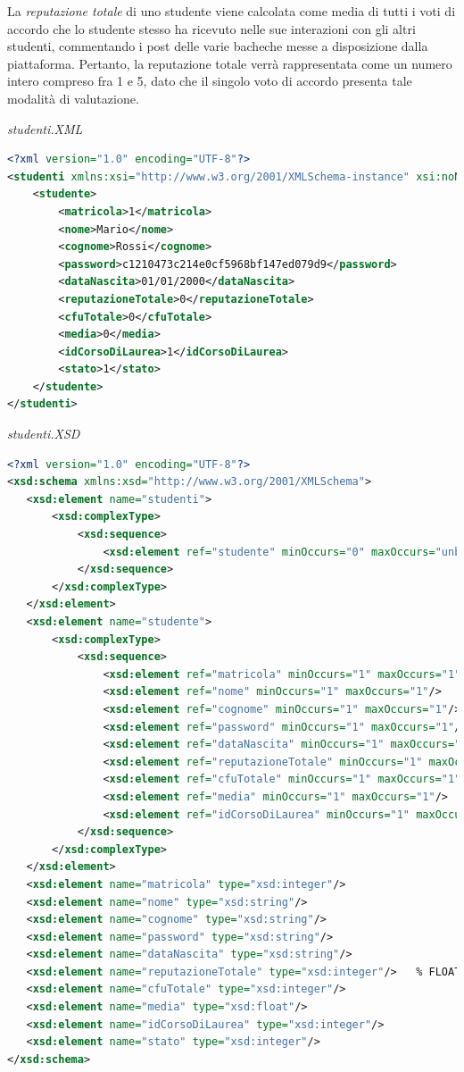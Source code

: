 \documentclass [a4paper,11pt]{book}
\begin{document}
La \emph{reputazione totale} di uno studente viene calcolata come media di tutti i voti di accordo che lo studente stesso ha ricevuto nelle sue interazioni con gli altri studenti, commentando i post delle varie bacheche messe a disposizione dalla piattaforma. Pertanto, la reputazione totale verrà rappresentata come un numero intero compreso fra 1 e 5, dato che il singolo voto di accordo presenta tale modalità di valutazione.

\medskip

\emph{studenti.XML}

\label{sec:studenti}

\begin{lstlisting}[language=XML]
<?xml version="1.0" encoding="UTF-8"?>
<studenti xmlns:xsi="http://www.w3.org/2001/XMLSchema-instance" xsi:noNamespaceSchemaLocation="studenti.xsd">
    <studente>
        <matricola>1</matricola>
        <nome>Mario</nome>
        <cognome>Rossi</cognome>
        <password>c1210473c214e0cf5968bf147ed079d9</password>
        <dataNascita>01/01/2000</dataNascita>
        <reputazioneTotale>0</reputazioneTotale>
        <cfuTotale>0</cfuTotale>
        <media>0</media>
        <idCorsoDiLaurea>1</idCorsoDiLaurea>
        <stato>1</stato>
    </studente>
</studenti>
\end{lstlisting}

\emph{studenti.XSD}

\begin{lstlisting}[language=XML]
<?xml version="1.0" encoding="UTF-8"?>
<xsd:schema xmlns:xsd="http://www.w3.org/2001/XMLSchema">
   <xsd:element name="studenti">
       <xsd:complexType>
           <xsd:sequence>
               <xsd:element ref="studente" minOccurs="0" maxOccurs="unbounded" />
           </xsd:sequence>
       </xsd:complexType>
   </xsd:element>
   <xsd:element name="studente">
       <xsd:complexType>
           <xsd:sequence>
               <xsd:element ref="matricola" minOccurs="1" maxOccurs="1"/>
               <xsd:element ref="nome" minOccurs="1" maxOccurs="1"/>
               <xsd:element ref="cognome" minOccurs="1" maxOccurs="1"/>
               <xsd:element ref="password" minOccurs="1" maxOccurs="1"/>
               <xsd:element ref="dataNascita" minOccurs="1" maxOccurs="1"/>
               <xsd:element ref="reputazioneTotale" minOccurs="1" maxOccurs="1"/>
               <xsd:element ref="cfuTotale" minOccurs="1" maxOccurs="1"/>
               <xsd:element ref="media" minOccurs="1" maxOccurs="1"/>
               <xsd:element ref="idCorsoDiLaurea" minOccurs="1" maxOccurs="1"/>
           </xsd:sequence>
       </xsd:complexType>
   </xsd:element>
   <xsd:element name="matricola" type="xsd:integer"/>
   <xsd:element name="nome" type="xsd:string"/>
   <xsd:element name="cognome" type="xsd:string"/>
   <xsd:element name="password" type="xsd:string"/>
   <xsd:element name="dataNascita" type="xsd:string"/>
   <xsd:element name="reputazioneTotale" type="xsd:integer"/>	% FLOAT!
   <xsd:element name="cfuTotale" type="xsd:integer"/>
   <xsd:element name="media" type="xsd:float"/>
   <xsd:element name="idCorsoDiLaurea" type="xsd:integer"/>
   <xsd:element name="stato" type="xsd:integer"/>
</xsd:schema>
\end{lstlisting}
\end{document}
